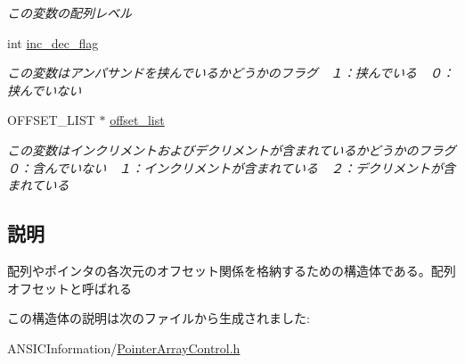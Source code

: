 \begin{DoxyCompactItemize}
\begin{DoxyCompactList}\small\item\em この変数の配列レベル \item\end{DoxyCompactList}\item 
int \hyperlink{structarray__offset_a6a247a3ddfb4d6ae418c81521b3b327e}{inc\_\-dec\_\-flag}\label{structarray__offset_a6a247a3ddfb4d6ae418c81521b3b327e}

\begin{DoxyCompactList}\small\item\em この変数はアンパサンドを挟んでいるかどうかのフラグ　１：挟んでいる　０：挟んでいない \item\end{DoxyCompactList}\item 
OFFSET\_\-LIST $\ast$ \hyperlink{structarray__offset_a3b07fc99c154fe2d99d1a31277897c65}{offset\_\-list}\label{structarray__offset_a3b07fc99c154fe2d99d1a31277897c65}

\begin{DoxyCompactList}\small\item\em この変数はインクリメントおよびデクリメントが含まれているかどうかのフラグ　０：含んでいない　１：インクリメントが含まれている　２：デクリメントが含まれている \item\end{DoxyCompactList}\end{DoxyCompactItemize}


\subsection{説明}
配列やポインタの各次元のオフセット関係を格納するための構造体である。配列オフセットと呼ばれる 

この構造体の説明は次のファイルから生成されました:\begin{DoxyCompactItemize}
\item 
ANSICInformation/\hyperlink{PointerArrayControl_8h}{PointerArrayControl.h}\end{DoxyCompactItemize}
